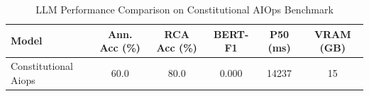 
\begin{table}[h]
\centering
\caption{LLM Performance Comparison on Constitutional AIOps Benchmark}
\label{tab:llm-comparison}
\begin{tabular}{lccccc}
\toprule
\textbf{Model} & \textbf{Ann. Acc (\%)} & \textbf{RCA Acc (\%)} & \textbf{BERT-F1} & \textbf{P50 (ms)} & \textbf{VRAM (GB)} \\
\midrule
Constitutional Aiops & 60.0 & 80.0 & 0.000 & 14237 & 15 \\

\bottomrule
\end{tabular}
\end{table}
